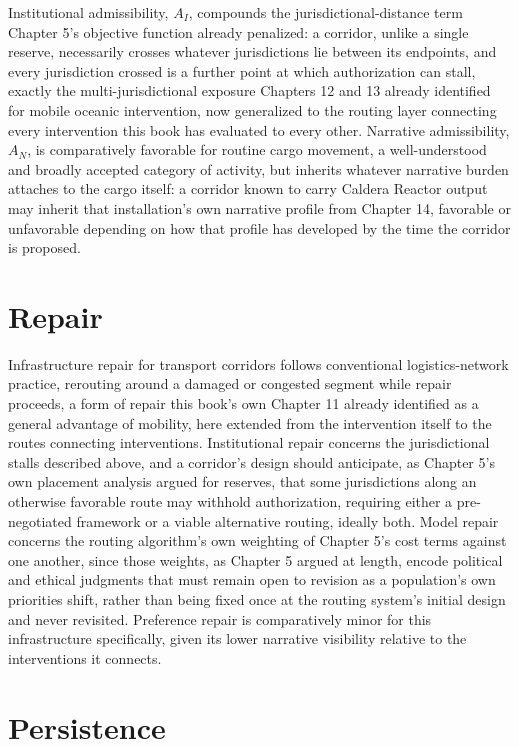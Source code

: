 \documentclass[11pt,oneside]{book}
\begin{document}
Institutional admissibility, $A_I$, compounds the jurisdictional-distance term Chapter 5's objective function already penalized: a corridor, unlike a single reserve, necessarily crosses whatever jurisdictions lie between its endpoints, and every jurisdiction crossed is a further point at which authorization can stall, exactly the multi-jurisdictional exposure Chapters 12 and 13 already identified for mobile oceanic intervention, now generalized to the routing layer connecting every intervention this book has evaluated to every other. Narrative admissibility, $A_N$, is comparatively favorable for routine cargo movement, a well-understood and broadly accepted category of activity, but inherits whatever narrative burden attaches to the cargo itself: a corridor known to carry Caldera Reactor output may inherit that installation's own narrative profile from Chapter 14, favorable or unfavorable depending on how that profile has developed by the time the corridor is proposed.

\section*{Repair}

Infrastructure repair for transport corridors follows conventional logistics-network practice, rerouting around a damaged or congested segment while repair proceeds, a form of repair this book's own Chapter 11 already identified as a general advantage of mobility, here extended from the intervention itself to the routes connecting interventions. Institutional repair concerns the jurisdictional stalls described above, and a corridor's design should anticipate, as Chapter 5's own placement analysis argued for reserves, that some jurisdictions along an otherwise favorable route may withhold authorization, requiring either a pre-negotiated framework or a viable alternative routing, ideally both. Model repair concerns the routing algorithm's own weighting of Chapter 5's cost terms against one another, since those weights, as Chapter 5 argued at length, encode political and ethical judgments that must remain open to revision as a population's own priorities shift, rather than being fixed once at the routing system's initial design and never revisited. Preference repair is comparatively minor for this infrastructure specifically, given its lower narrative visibility relative to the interventions it connects.

\section*{Persistence}
\end{document}
